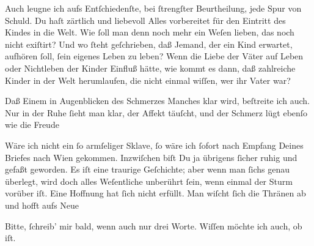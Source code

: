 \pstart
           Auch leugne ich aufs Entſchiedenſte, bei ſtrengſter Beurtheilung, jede Spur von
               Schuld. Du haſt zärtlich und liebevoll Alles vorbereitet für den Eintritt des Kindes in die Welt. Wie ſoll
               man denn noch mehr ein Weſen lieben, das noch nicht exiſtirt? Und wo ſteht
               geſchrieben, daß Jemand, der ein Kind erwartet, aufhören {\pb}ſoll, ſein eigenes Leben zu leben? Wenn die Liebe
               der Väter auf Leben oder Nichtleben der Kinder Einfluß hätte, wie kommt es dann, daß
               zahlreiche Kinder in der Welt herumlaufen, die nicht einmal wiſſen, wer ihr Vater
                  war? {\dotsfive}\pend
           
\pstart
           Daß Einem in Augenblicken des Schmerzes Manches klar wird, beſtreite ich auch. Nur in
               der Ruhe ſieht man klar, der Affekt täuſcht, und der Schmerz lügt ebenſo wie die
                  Freude{\dotsfour}\pend
           
\pstart
           Wäre ich nicht ein ſo armſeliger Sklave, ſo wäre ich ſofort nach Empfang Deines
               Briefes {\pb}nach Wien gekommen. Inzwiſchen biſt Du ja übrigens ſicher ruhig und gefaßt
               geworden. Es iſt eine traurige Geſchichte; aber wenn man ſichs genau überlegt, wird
               doch alles Weſentliche unberührt ſein, wenn einmal der Sturm vorüber iſt. Eine
               Hoffnung hat ſich nicht erfüllt. Man wiſcht ſich die Thränen ab und hofft aufs Neue{\dotsfour}\pend
           
\pstart
           Bitte, ſchreib’ mir bald, wenn auch nur drei Worte. Wiſſen möchte ich auch, ob
                  \label{K_L02827-2v}\label{K_L02827-2} iſt.\pend
           
